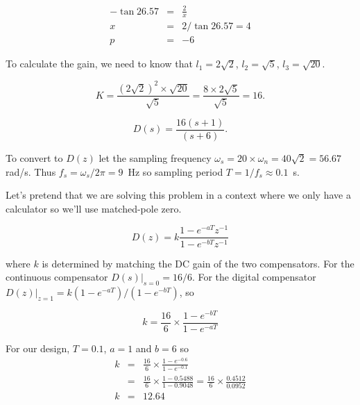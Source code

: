 \begin{eqnarray*}
	-\tan 26.57 & = & \frac{2}{x} \\
	x & = & 2/\tan 26.57 = 4 \\
	p & = & -6
\end{eqnarray*}


\begin{slide}\label{slides:ex1-2}
\end{slide}

To calculate the gain, we need to know that $l_1=2\sqrt{2}$, $l_2=\sqrt{5}$, $l_3=\sqrt{20}$.

$$K = \frac{(2\sqrt{2})^2\times \sqrt{20}}{\sqrt{5}} = \frac{8\times 2\sqrt{5}}{\sqrt{5}} = 16.$$

$$D(s) = \frac{16(s+1)}{(s+6)}.$$

To convert to $D(z)$ let the sampling frequency $\omega_s=20\times \omega_n = 40\sqrt{2}=56.67$ rad/s. Thus $f_s=\omega_s/2\pi = 9$~Hz so sampling period $T = 1/f_s \approx 0.1$~s.

Let's pretend that we are solving this problem in a context where we only have a calculator so we'll use matched-pole zero.

$$D(z)=k\frac{1-e^{-aT}z^{-1}}{1-e^{-bT}z^{-1}}$$

where $k$ is determined by matching the DC gain of the two compensators. For the continuous compensator $D(s)|_{s=0} = 16/6$. For the digital compensator $D(z)|_{z=1} = k(1-e^{-aT})/(1-e^{-bT})$, so

$$k=\frac{16}{6}\times\frac{1-e^{-bT}}{1-e^{-aT}}$$

For our design, $T=0.1$, $a=1$ and $b=6$ so 
\begin{eqnarray*}
	k & = & \frac{16}{6}\times\frac{1-e^{-0.6}}{1-e^{-0.1}} \\
	&= & \frac{16}{6}\times\frac{1-0.5488}{1-0.9048} = \frac{16}{6}\times\frac{0.4512}{0.0952}  \\
	k & = & 12.64
\end{eqnarray*}	

